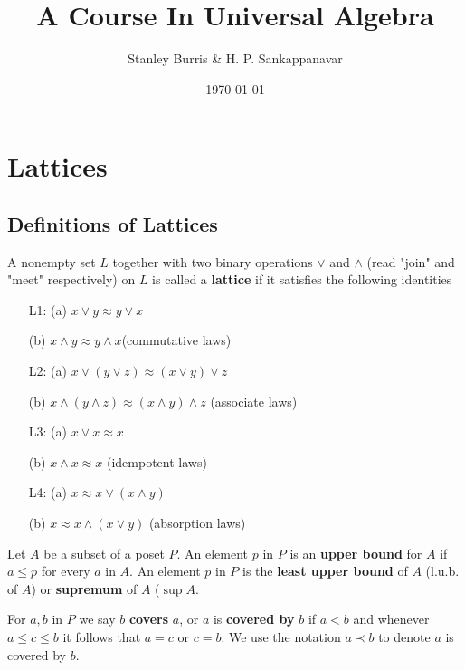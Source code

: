 \documentclass[11pt]{article}
\author{Stanley Burris \& H. P. Sankappanavar}
\date{\today}
\title{A Course In Universal Algebra}
\begin{document}
\maketitle \clearpage
\tableofcontents \clearpage
\section{Lattices}
\label{sec:org9b69538}

\subsection{Definitions of Lattices}
\label{sec:org713f090}
\begin{definition}[]
A nonempty set \(L\) together with two binary operations \(\vee\) and \(\wedge\)
(read "join" and "meet" respectively) on \(L\) is called a \textbf{lattice} if it
satisfies the following identities
\begin{itemize}%
 \item[L1:] (a) $x\vee y\approx y\vee x$ \par
 (b) $x\wedge y\approx y\wedge x$\hspace*{\fill}(commutative laws)
 \item[L2:] (a) $x\vee(y\vee z)\approx(x\vee y)\vee z$ \par 
 (b) $x\wedge(y\wedge z)\approx(x\wedge y)\wedge z$
 \hspace*{\fill}(associate laws)
 \item[L3:] (a) \(x\vee x\approx x\)\par 
 (b) \(x\wedge x\approx x\)
 \hspace*{\fill}(idempotent laws)
 \item[L4:] (a) \(x\approx x\vee(x\wedge y)\)\par 
 (b) \(x\approx x\wedge(x\vee y)\)
 \hspace*{\fill}(absorption laws)
\end{itemize}
\end{definition}

\begin{definition}[]
Let \(A\) be a subset of a poset \(P\). An element \(p\) in \(P\) is an \textbf{upper bound}
for \(A\) if \(a\le p\) for every \(a\) in \(A\). An element \(p\) in \(P\) is the
\textbf{least upper bound} of \(A\) (l.u.b. of \(A\)) or \textbf{supremum} of \(A\) (\(\sup A\).

For \(a,b\) in \(P\) we say \(b\) \textbf{covers} \(a\), or \(a\) is \textbf{covered by} \(b\) if
\(a<b\) and whenever \(a\le c\le b\) it follows that \(a=c\) or \(c=b\). We
use the notation \(a\prec b\) to denote \(a\) is covered by \(b\). 
\end{definition}
\end{document}
